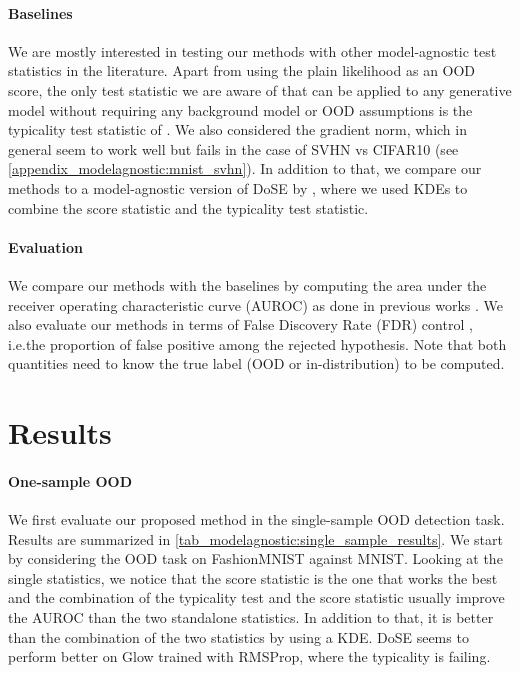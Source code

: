 {\paragraph{Baselines} We are mostly interested in testing our methods with other model-agnostic test statistics in the literature. Apart from using the plain likelihood as an OOD score, the only test statistic we are aware of that can be applied to any generative model without requiring any background model or OOD assumptions is the typicality test statistic of \textcite{nalisnick_detecting_2019}. We also considered the gradient norm, which in general seem to work well but fails in the case of SVHN vs CIFAR10 (see \cref{appendix_modelagnostic:mnist_svhn}). In addition to that, we compare our methods to a model-agnostic version of DoSE by \textcite{morningstar_density_2021}, where we used KDEs to combine the score statistic and the typicality test statistic. 


\paragraph{Evaluation} We compare our methods with the baselines by computing the area under the receiver operating characteristic curve (AUROC) as done in previous works \parencite{hendrycks_deep_2019, ren_likelihood_2019, morningstar_density_2021}. We also evaluate our methods in terms of False Discovery Rate (FDR) control \textcite{benjamini_controlling_1995}, i.e.\@ the proportion of false positive among the rejected hypothesis. Note that both quantities need to know the true label (OOD or in-distribution) to be computed.


\section{Results}

\paragraph{One-sample OOD}
We first evaluate our proposed method in the single-sample OOD detection task. Results are summarized in \cref{tab_modelagnostic:single_sample_results}. We start by considering the OOD task on FashionMNIST against MNIST. Looking at the single statistics, we notice that the score statistic is the one that works the best and the combination of the typicality test and the score statistic usually improve the AUROC than the two standalone statistics. In addition to that, it is better than the combination of the two statistics by using a KDE. DoSE seems to perform better on Glow trained with RMSProp, where the typicality is failing. 

}

